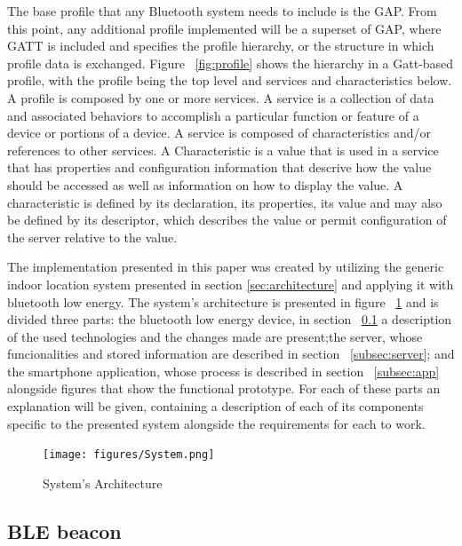 \documentclass[a4paper]{IEEEtran}
\begin{document}
The base profile that any Bluetooth system needs to include is the GAP. From this point, any additional profile implemented will be a superset of GAP, where GATT is included and specifies the profile hierarchy, or the structure in which profile data is exchanged. Figure  ~\ref{fig:profile} shows the hierarchy in a Gatt-based profile, with the profile being the top level and services and characteristics below. 
A profile is composed by one or more services. A service is a collection of data and associated behaviors to accomplish a particular function or feature of a device or portions of a device. A service is composed of characteristics and/or references to other services.
A Characteristic is a value that is used in a service that has properties and configuration information that descrive how the value should be accessed as well as information on how to display the value. A characteristic is defined by its declaration, its properties, its value and may also be defined by its descriptor, which describes the value or permit configuration of the server relative to the value.


The implementation presented in this paper was created by utilizing the generic indoor location system presented in section \ref{sec:architecture} and applying it with bluetooth low energy. The system's architecture is presented in figure ~\ref{fig:implementation} and is divided three parts: the bluetooth low energy device, in section ~\ref{subsec:beacon} a description of the used technologies and the changes made are present;the server, whose funcionalities and stored information are described in section ~\ref{subsec:server}; and the smartphone application, whose process is described in section ~\ref{subsec:app} alongside figures that show the functional prototype. For each of these parts an explanation will be given, containing a description of each of its components specific to the presented system alongside the requirements for each to work.

\begin{figure}
	\centering
		\texttt{[image: figures/System.png]}
	\caption[System's Architecture]{System's Architecture}
	\label{fig:implementation}
\end{figure}

\subsection{ BLE beacon}
\label{subsec:beacon}
\end{document}
